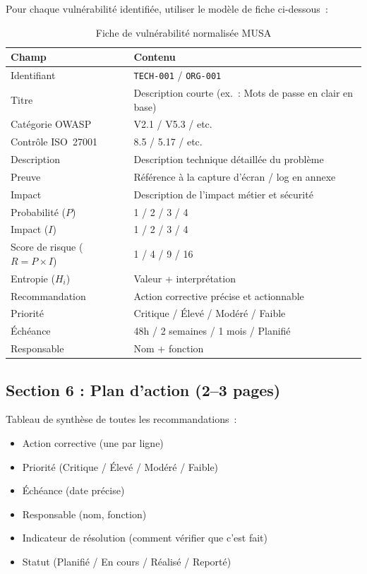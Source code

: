 \documentclass[12pt,a4paper,oneside]{report}
\begin{document}
Pour chaque vuln\'erabilit\'e identifi\'ee, utiliser le mod\`ele de fiche
ci-dessous~:

\begin{table}[H]
\centering\small
\caption{Fiche de vuln\'erabilit\'e normalis\'ee MUSA}
\label{tab:fiche_vuln}
\begin{tabularx}{\textwidth}{p{4cm}X}
\toprule
\rowcolor{theadcolor}
\color{white}\textbf{Champ} &
\color{white}\textbf{Contenu} \\
\midrule
Identifiant & \texttt{TECH-001} / \texttt{ORG-001} \\
Titre & Description courte (ex.~: Mots de passe en clair en base) \\
Cat\'egorie OWASP & V2.1 / V5.3 / etc. \\
Contr\^ole ISO~27001 & 8.5 / 5.17 / etc. \\
Description & Description technique d\'etaill\'ee du probl\`eme \\
Preuve & R\'ef\'erence \`a la capture d'\'ecran / log en annexe \\
Impact & Description de l'impact m\'etier et s\'ecurit\'e \\
Probabilit\'e ($P$) & 1 / 2 / 3 / 4 \\
Impact ($I$) & 1 / 2 / 3 / 4 \\
Score de risque ($R = P \times I$) & 1 / 4 / 9 / 16 \\
Entropie ($H_i$) & Valeur + interpr\'etation \\
Recommandation & Action corrective pr\'ecise et actionnable \\
Priorit\'e & Critique / \'Elev\'e / Mod\'er\'e / Faible \\
\'Ech\'eance & 48h / 2 semaines / 1 mois / Planifi\'e \\
Responsable & Nom + fonction \\
\bottomrule
\end{tabularx}
\end{table}

\subsection*{Section 6 : Plan d'action (2--3 pages)}

\begin{encadre}
Tableau de synth\`ese de toutes les recommandations~:
\begin{itemize}[label={\color{gold}}, leftmargin=*]
\item Action corrective (une par ligne)
\item Priorit\'e (Critique / \'Elev\'e / Mod\'er\'e / Faible)
\item \'Ech\'eance (date pr\'ecise)
\item Responsable (nom, fonction)
\item Indicateur de r\'esolution (comment v\'erifier que c'est fait)
\item Statut (Planifi\'e / En cours / R\'ealis\'e / Report\'e)
\end{itemize}
\end{encadre}
\end{document}
